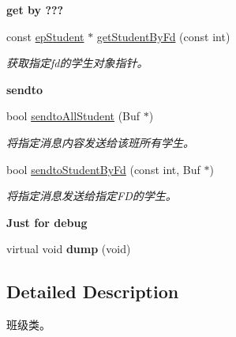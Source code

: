 \begin{Indent}{\bf get by ???}\par
\begin{DoxyCompactItemize}
\item 
const \hyperlink{classepStudent}{ep\-Student} $\ast$ \hyperlink{classepClass_ada1ed1a3e390b2c9679f2948bab103cc}{get\-Student\-By\-Fd} (const int)
\begin{DoxyCompactList}\small\item\em 获取指定fd的学生对象指针。 \end{DoxyCompactList}\end{DoxyCompactItemize}
\end{Indent}
\begin{Indent}{\bf sendto}\par
\begin{DoxyCompactItemize}
\item 
bool \hyperlink{classepClass_acf204fd6db6e1ce014b8b6269456c2a4}{sendto\-All\-Student} (\-Buf $\ast$)
\begin{DoxyCompactList}\small\item\em 将指定消息内容发送给该班所有学生。 \end{DoxyCompactList}\item 
bool \hyperlink{classepClass_ad4314568f339eafeb6e6bd27a4075a97}{sendto\-Student\-By\-Fd} (const int, \-Buf $\ast$)
\begin{DoxyCompactList}\small\item\em 将指定消息发送给指定\-F\-D的学生。 \end{DoxyCompactList}\end{DoxyCompactItemize}
\end{Indent}
\begin{Indent}{\bf \-Just for debug}\par
\begin{DoxyCompactItemize}
\item 
\hypertarget{classepClass_aa0fa7a7e3c9cd9d600d418301ac1e461}{virtual void {\bfseries dump} (void)}\label{classepClass_aa0fa7a7e3c9cd9d600d418301ac1e461}

\end{DoxyCompactItemize}
\end{Indent}


\subsection{\-Detailed \-Description}
班级类。 

